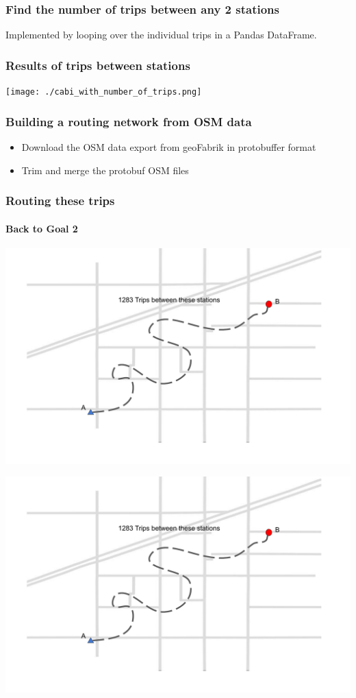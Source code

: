 \documentclass{beamer}
\begin{document}
\begin{frame}
    \frametitle{Find the number of trips between any 2 stations}

    Implemented by looping over the individual trips in a Pandas DataFrame.
\end{frame}
\begin{frame}
    \frametitle{Results of trips between stations}
    \texttt{[image: ./cabi\_with\_number\_of\_trips.png]}
\end{frame}
\begin{frame}
    \frametitle{Building a routing network from OSM data}
    \begin{itemize}
        \item Download the OSM data export from geoFabrik in protobuffer format
        \item Trim and merge the protobuf OSM files
    \end{itemize}
\end{frame}
\begin{frame}
    \frametitle{Routing these trips}
    \framesubtitle{Back to Goal 2}
    \includegraphics[width=\textwidth,page=1]{graphics_document.pdf}
\end{frame}
\begin{frame}
    \includegraphics[width=\textwidth,page=2]{graphics_document.pdf}
\end{frame}
\end{document}
